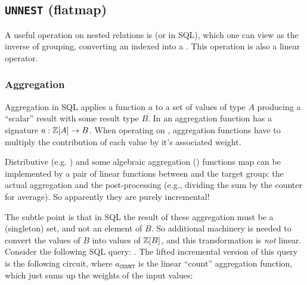 \subsection{\texttt{UNNEST} (flatmap)}

A useful operation on nested relations is  (or
 in SQL), which one can view as the inverse of grouping,
converting an indexed \zr into a \zr.  This operation is also a linear
\dbsp operator.

\subsubsection{Aggregation}\label{sec:aggregation}

Aggregation in SQL applies a function $a$ to a set of values of type
$A$ producing a ``scalar'' result with some result type $B$.  In \dbsp
an aggregation function has a signature $a: \mathbb{Z}[A] \to B$.  When
operating on \zrs, aggregation functions have to multiply the
contribution of each value by it's associated weight.

Distributive (e.g. ) and some algebraic aggregation
() functions map can be implemented by a pair of linear
functions between \zrs and the target group: the actual aggregation
and the post-processing (e.g., dividing the sum by the counter for
average).  So apparently they are purely incremental!

The subtle point is that in SQL the result of these aggregation must
be a (singleton) set, and not an element of $B$.  So additional
machinery is needed to convert the values of $B$ into values of
$\mathbb{Z}[B]$, and this transformation is \emph{not} linear.  Consider the
following SQL query: .  The lifted
incremental version of this query is the following circuit, where
$a_\texttt{COUNT}$ is the linear ``count'' aggregation function, which
just sums up the weights of the input values:


